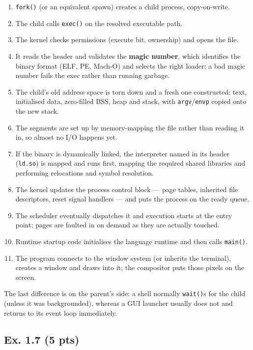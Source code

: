 \begin{enumerate}[itemsep=0pt, topsep=3pt]
  \item \texttt{fork()} (or an equivalent spawn) creates a child process, copy-on-write.
  \item The child calls \texttt{exec()} on the resolved executable path.
  \item The kernel checks permissions (execute bit, ownership) and opens the file.
  \item It reads the header and validates the \textbf{magic number}, which identifies the
        binary format (ELF, PE, Mach-O) and selects the right loader; a bad magic number
        fails the exec rather than running garbage.
  \item The child's old address space is torn down and a fresh one constructed: text,
        initialised data, zero-filled BSS, heap and stack, with \texttt{argv}/\texttt{envp}
        copied onto the new stack.
  \item The segments are set up by memory-mapping the file rather than reading it in, so
        almost no I/O happens yet.
  \item If the binary is dynamically linked, the interpreter named in its header
        (\texttt{ld.so}) is mapped and runs first, mapping the required shared libraries
        and performing relocations and symbol resolution.
  \item The kernel updates the process control block --- page tables, inherited file
        descriptors, reset signal handlers --- and puts the process on the ready queue.
  \item The scheduler eventually dispatches it and execution starts at the entry point;
        pages are faulted in on demand as they are actually touched.
  \item Runtime startup code initialises the language runtime and then calls
        \texttt{main()}.
  \item The program connects to the window system (or inherits the terminal), creates a
        window and draws into it; the compositor puts those pixels on the screen.
\end{enumerate}

\noindent The last difference is on the parent's side: a shell normally \texttt{wait()}s
for the child (unless it was backgrounded), whereas a GUI launcher usually does not and
returns to its event loop immediately.

\subsection*{Ex. 1.7 (5 pts)}

